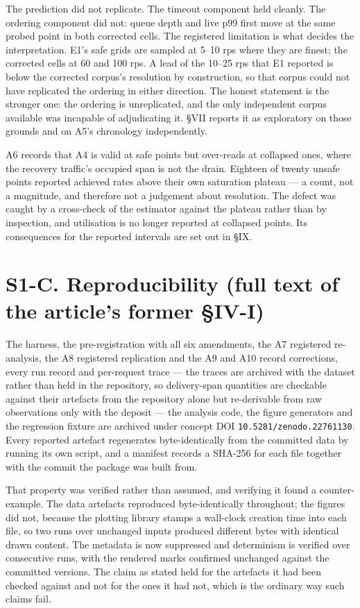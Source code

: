 \documentclass{ieeeaccess}
\begin{document}
The prediction did not replicate. The timeout component held cleanly. The ordering component did not: queue depth and live p99 first move at the same probed point in both corrected cells. The registered limitation is what decides the interpretation. E1's safe grids are sampled at 5--10 rps where they are finest; the corrected cells at 60 and 100 rps. A lead of the 10--25 rps that E1 reported is below the corrected corpus's resolution by construction, so that corpus could not have replicated the ordering in either direction. The honest statement is the stronger one: the ordering is unreplicated, and the only independent corpus available was incapable of adjudicating it. \S{}VII reports it as exploratory on those grounds and on A5's chronology independently.

A6 records that A4 is valid at safe points but over-reads at collapsed ones, where the recovery traffic's occupied span is not the drain. Eighteen of twenty unsafe points reported achieved rates above their own saturation plateau --- a count, not a magnitude, and therefore not a judgement about resolution. The defect was caught by a cross-check of the estimator against the plateau rather than by inspection, and utilisation is no longer reported at collapsed points. Its consequences for the reported intervals are set out in \S{}IX.

\section*{S1-C. Reproducibility (full text of the article's former \S{}IV-I)}

The harness, the pre-registration with all six amendments, the A7 registered re-analysis, the A8 registered replication and the A9 and A10 record corrections, every run record and per-request trace --- the traces are archived with the dataset rather than held in the repository, so delivery-span quantities are checkable against their artefacts from the repository alone but re-derivable from raw observations only with the deposit --- the analysis code, the figure generators and the regression fixture are archived under concept DOI \texttt{10.5281/zenodo.22761130}. Every reported artefact regenerates byte-identically from the committed data by running its own script, and a manifest records a SHA-256 for each file together with the commit the package was built from.

That property was verified rather than assumed, and verifying it found a counter-example. The data artefacts reproduced byte-identically throughout; the figures did not, because the plotting library stamps a wall-clock creation time into each file, so two runs over unchanged inputs produced different bytes with identical drawn content. The metadata is now suppressed and determinism is verified over consecutive runs, with the rendered marks confirmed unchanged against the committed versions. The claim as stated held for the artefacts it had been checked against and not for the ones it had not, which is the ordinary way such claims fail.
\end{document}
